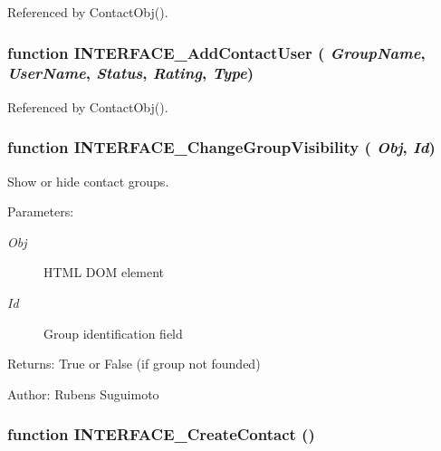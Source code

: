 Referenced by ContactObj().
\subsubsection[INTERFACE\_\-AddContactUser]{\setlength{\rightskip}{0pt plus 5cm}function INTERFACE\_\-AddContactUser ( {\em GroupName}, \/   {\em UserName}, \/   {\em Status}, \/   {\em Rating}, \/   {\em Type})}\label{interface_2contact_8js_5b544f15b2ba98d7ea117c9a1a98967e}




Referenced by ContactObj().
\subsubsection[INTERFACE\_\-ChangeGroupVisibility]{\setlength{\rightskip}{0pt plus 5cm}function INTERFACE\_\-ChangeGroupVisibility ( {\em Obj}, \/   {\em Id})}\label{interface_2contact_8js_82de8f8952b342b44f73504bd21680e4}


Show or hide contact groups. 

\begin{Desc}
\item[Parameters:]
\begin{description}
\item[{\em Obj}]HTML DOM element \item[{\em Id}]Group identification field \end{description}
\end{Desc}
\begin{Desc}
\item[Returns:]True or False (if group not founded) \end{Desc}
\begin{Desc}
\item[Author:]Rubens Suguimoto \end{Desc}
\subsubsection[INTERFACE\_\-CreateContact]{\setlength{\rightskip}{0pt plus 5cm}function INTERFACE\_\-CreateContact ()}\label{interface_2contact_8js_fc3a4302d4c9bf87f8f09296189d184e}



